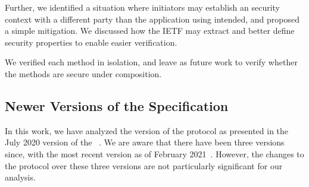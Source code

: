 \documentclass[a4paper,twoside,draft]{article}
\begin{document}
Further, we identified a situation where initiators may establish an \mOscore{}
security context with a different party than the application using \mEdhoc{}
intended, and proposed a simple mitigation.
%
We discussed how the IETF may extract and better define security properties to
enable easier verification.

We verified each method in isolation, and leave as future work to verify whether
the methods are secure under composition.

\subsection{Newer Versions of the Specification} \label{sec:newdrafts}
In this work, we have analyzed the version of the \mEdhoc{} protocol as
presented in the July 2020 version of the
\mSpec{}~\cite{our-analysis-selander-lake-edhoc-00}.
%
We are aware that there have been three versions since,
with the most recent version as
of February 2021~\cite{latest-ietf-lake-edhoc-05}.
%
However, the changes to the protocol over these three versions are not
particularly significant for our analysis.
%

%






\appendix
\end{document}
